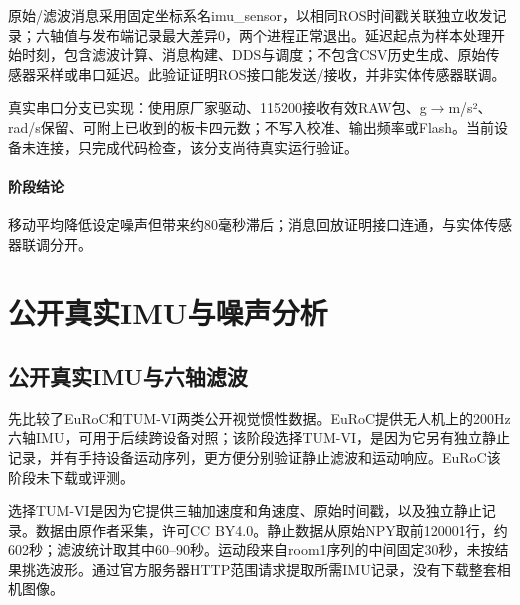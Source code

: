 原始/滤波消息采用固定坐标系名imu\_sensor，以相同ROS时间戳关联独立收发记录；六轴值与发布端记录最大差异0，两个进程正常退出。延迟起点为样本处理开始时刻，包含滤波计算、消息构建、DDS与调度；不包含CSV历史生成、原始传感器采样或串口延迟。此验证证明ROS接口能发送/接收，并非实体传感器联调。

真实串口分支已实现：使用原厂家驱动、115200接收有效RAW包、g\(\rightarrow\)m/s²、rad/s保留、可附上已收到的板卡四元数；不写入校准、输出频率或Flash。当前设备未连接，只完成代码检查，该分支尚待真实运行验证。


\paragraph{阶段结论}移动平均降低设定噪声但带来约80毫秒滞后；消息回放证明接口连通，与实体传感器联调分开。


\FloatBarrier

\section{公开真实IMU与噪声分析}

\label{stage:s07}

\subsection{公开真实IMU与六轴滤波}\label{s07-detail-1}

先比较了EuRoC和TUM-VI两类公开视觉惯性数据。EuRoC提供无人机上的200Hz六轴IMU，可用于后续跨设备对照；该阶段选择TUM-VI，是因为它另有独立静止记录，并有手持设备运动序列，更方便分别验证静止滤波和运动响应。EuRoC该阶段未下载或评测。

选择TUM-VI是因为它提供三轴加速度和角速度、原始时间戳，以及独立静止记录。数据由原作者采集，许可CC BY4.0。静止数据从原始NPY取前120001行，约602秒；滤波统计取其中60--90秒。运动段来自room1序列的中间固定30秒，未按结果挑选波形。通过官方服务器HTTP范围请求提取所需IMU记录，没有下载整套相机图像。

